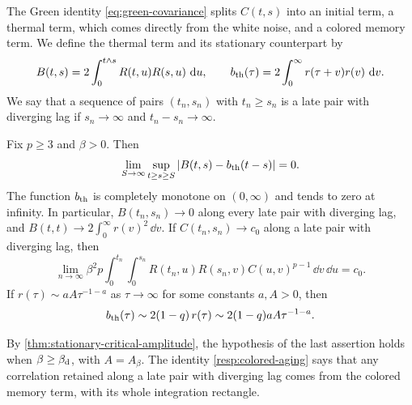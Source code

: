 The Green identity \eqref{eq:green-covariance} splits $C(t,s)$ into an initial term, a thermal term, which comes directly from the white noise, and a colored memory term. We define the thermal term and its stationary counterpart by
\[
 B(t,s)=2\int_0^{t\wedge s}R(t,u)R(s,u)\,\mathop{}\!\mathrm d u,
 \qquad b_{\rm th}(\tau)=2\int_0^\infty r(\tau+v)r(v)\,\mathop{}\!\mathrm d v.
\]
We say that a sequence of pairs $(t_n,s_n)$ with $t_n\ge s_n$ is a late pair with diverging lag if $s_n\to\infty$ and $t_n-s_n\to\infty$.

\begin{corollary}
\label{resp:thermal}
Fix $p\ge3$ and $\beta>0$. Then
\begin{equation}
 \lim_{S\to\infty}\sup_{t\ge s\ge S}|B(t,s)-b_{\rm th}(t-s)|=0.
 \label{resp:thermal-uniform}
\end{equation}
The function $b_{\rm th}$ is completely monotone on $(0,\infty)$ and tends to zero at infinity. In particular, $B(t_n,s_n)\to0$ along every late pair with diverging lag, and $B(t,t)\to2\int_0^\infty r(v)^2\,\dd v$. If $C(t_n,s_n)\to c_0$ along a late pair with diverging lag, then
\begin{equation}
 \lim_{n\to\infty}\beta^2p\int_0^{t_n}\int_0^{s_n}
 R(t_n,u)R(s_n,v)C(u,v)^{p-1}\,\dd v\,\dd u=c_0.
 \label{resp:colored-aging}
\end{equation}
If $r(\tau)\sim aA\tau^{-1-a}$ as $\tau\to\infty$ for some constants $a,A>0$, then
\begin{equation}
 b_{\rm th}(\tau)\sim2(1-q)\,r(\tau)
 \sim2(1-q)aA\tau^{-1-a}.
 \label{resp:thermal-tail}
\end{equation}
\end{corollary}

By \cref{thm:stationary-critical-amplitude}, the hypothesis of the last assertion holds when $\beta\ge\beta_{\mathrm d}$, with $A=A_\beta$. The identity \eqref{resp:colored-aging} says that any correlation retained along a late pair with diverging lag comes from the colored memory term, with its whole integration rectangle.

